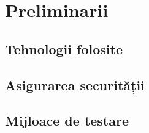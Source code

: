 \chapter{Preliminarii}

\section{Tehnologii folosite}

\section{Asigurarea securității}

\section{Mijloace de testare}

